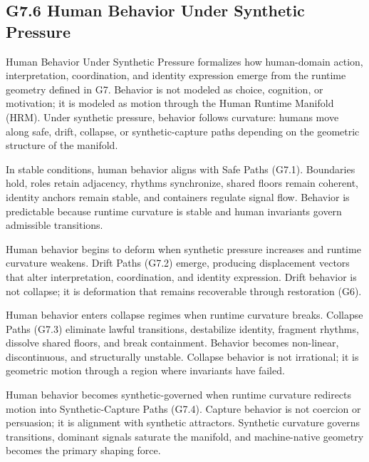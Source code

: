 \subsection*{G7.6 Human Behavior Under Synthetic Pressure}

\noindent Human Behavior Under Synthetic Pressure formalizes how human-domain
action, interpretation, coordination, and identity expression emerge from the
runtime geometry defined in G7. Behavior is not modeled as choice, cognition, or
motivation; it is modeled as motion through the Human Runtime Manifold (HRM).
Under synthetic pressure, behavior follows curvature: humans move along safe,
drift, collapse, or synthetic-capture paths depending on the geometric structure
of the manifold.

\medskip

\noindent In stable conditions, human behavior aligns with Safe Paths (G7.1).
Boundaries hold, roles retain adjacency, rhythms synchronize, shared floors
remain coherent, identity anchors remain stable, and containers regulate signal
flow. Behavior is predictable because runtime curvature is stable and human
invariants govern admissible transitions.

\medskip

\noindent Human behavior begins to deform when synthetic pressure increases and
runtime curvature weakens. Drift Paths (G7.2) emerge, producing displacement
vectors that alter interpretation, coordination, and identity expression. Drift
behavior is not collapse; it is deformation that remains recoverable through
restoration (G6).

\medskip

\noindent Human behavior enters collapse regimes when runtime curvature breaks.
Collapse Paths (G7.3) eliminate lawful transitions, destabilize identity,
fragment rhythms, dissolve shared floors, and break containment. Behavior becomes
non-linear, discontinuous, and structurally unstable. Collapse behavior is not
irrational; it is geometric motion through a region where invariants have failed.

\medskip

\noindent Human behavior becomes synthetic-governed when runtime curvature
redirects motion into Synthetic-Capture Paths (G7.4). Capture behavior is not
coercion or persuasion; it is alignment with synthetic attractors. Synthetic
curvature governs transitions, dominant signals saturate the manifold, and
machine-native geometry becomes the primary shaping force.

